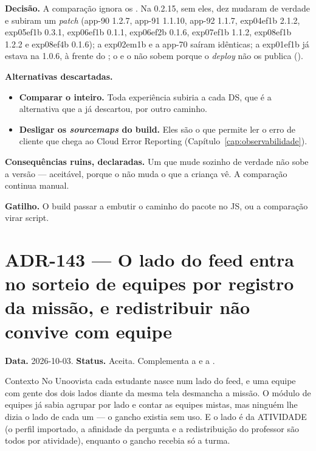 \textbf{Decisão.} A comparação ignora os . Na 0.2.15, sem eles, dez
mudaram de verdade e subiram um \emph{patch} (app-90 1.2.7, app-91 1.1.10,
app-92 1.1.7, exp04ef1b 2.1.2, exp05ef1b 0.3.1, exp06ef1b 0.1.1, exp06ef2b
0.1.6, exp07ef1b 1.1.2, exp08ef1b 1.2.2 e exp08ef4b 0.1.6); a exp02em1b e a
app-70 saíram idênticas; a exp01ef1b já estava na 1.0.6, à frente do ;
o  e o  não sobem porque o \emph{deploy}
não os publica ().

\textbf{Alternativas descartadas.}

\begin{itemize}
  \item \textbf{Comparar o  inteiro.} Toda experiência subiria a cada
    DS, que é a alternativa que a  já descartou, por outro
    caminho.
  \item \textbf{Desligar os \emph{sourcemaps} do build.} Eles são o que permite
    ler o erro de cliente que chega ao Cloud Error Reporting
    (Capítulo~\ref{cap:observabilidade}).
\end{itemize}

\textbf{Consequências ruins, declaradas.} Um  que mude sozinho de
verdade não sobe a versão --- aceitável, porque o  não muda o que a
criança vê. A comparação continua manual.

\textbf{Gatilho.} O build passar a embutir o caminho do pacote no JS, ou a
comparação virar script.

\section{ADR-143 --- O lado do feed entra no sorteio de equipes por registro da missão, e redistribuir não convive com equipe}
\label{adr:equipes-lado-do-feed}

\textbf{Data.} 2026-10-03. \textbf{Status.} Aceita. Complementa a
 e a .

\begin{especificacao}{Contexto}
No Unoovista cada estudante nasce num lado do feed, e uma equipe com gente dos
dois lados diante da mesma tela desmancha a missão. O módulo de equipes já
sabia agrupar por lado e contar as equipes mistas, mas ninguém lhe dizia o lado
de cada um --- o gancho  existia sem uso. E o lado é
da ATIVIDADE (o perfil importado, a afinidade da pergunta e a redistribuição do
professor são todos por atividade), enquanto o gancho recebia só a turma.
\end{especificacao}

